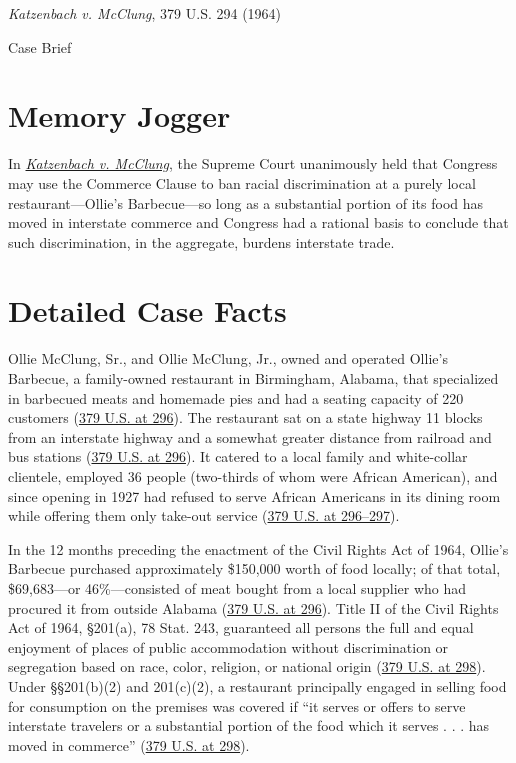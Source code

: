 \documentclass[12pt]{article}
\begin{document}
\begin{center}
{\LARGE \textit{Katzenbach v. McClung}, 379 U.S. 294 (1964)\par}
\vspace{0.8em}
{\large Case Brief\par}
\end{center}
\vspace{1em}

\section{Memory Jogger}

In \href{https://www.courtlistener.com/opinion/106951/katzenbach-v-mcclung/}{\textit{Katzenbach v. McClung}}, the Supreme Court unanimously held that Congress may use the Commerce Clause to ban racial discrimination at a purely local restaurant---Ollie's Barbecue---so long as a substantial portion of its food has moved in interstate commerce and Congress had a rational basis to conclude that such discrimination, in the aggregate, burdens interstate trade.

\section{Detailed Case Facts}

Ollie McClung, Sr., and Ollie McClung, Jr., owned and operated Ollie's Barbecue, a family-owned restaurant in Birmingham, Alabama, that specialized in barbecued meats and homemade pies and had a seating capacity of 220 customers (\href{https://supreme.justia.com/cases/federal/us/379/294/}{379 U.S. at 296}). The restaurant sat on a state highway 11 blocks from an interstate highway and a somewhat greater distance from railroad and bus stations (\href{https://supreme.justia.com/cases/federal/us/379/294/}{379 U.S. at 296}). It catered to a local family and white-collar clientele, employed 36 people (two-thirds of whom were African American), and since opening in 1927 had refused to serve African Americans in its dining room while offering them only take-out service (\href{https://supreme.justia.com/cases/federal/us/379/294/}{379 U.S. at 296--297}).

In the 12 months preceding the enactment of the Civil Rights Act of 1964, Ollie's Barbecue purchased approximately \$150,000 worth of food locally; of that total, \$69,683---or 46\%---consisted of meat bought from a local supplier who had procured it from outside Alabama (\href{https://supreme.justia.com/cases/federal/us/379/294/}{379 U.S. at 296}). Title II of the Civil Rights Act of 1964, \S 201(a), 78 Stat. 243, guaranteed all persons the full and equal enjoyment of places of public accommodation without discrimination or segregation based on race, color, religion, or national origin (\href{https://supreme.justia.com/cases/federal/us/379/294/}{379 U.S. at 298}). Under \S\S 201(b)(2) and 201(c)(2), a restaurant principally engaged in selling food for consumption on the premises was covered if ``it serves or offers to serve interstate travelers or a substantial portion of the food which it serves . . . has moved in commerce'' (\href{https://supreme.justia.com/cases/federal/us/379/294/}{379 U.S. at 298}).
\end{document}
